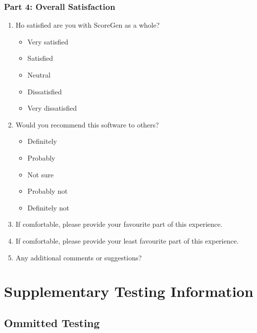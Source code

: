 \documentclass[12pt, titlepage]{article}
\begin{document}
\subsubsection*{Part 4: Overall Satisfaction}
\begin{enumerate}[resume, leftmargin=*]
  \item Ho satisfied are you with ScoreGen as a whole?
  \begin{itemize}
    \item Very satisfied
    \item Satisfied
    \item Neutral
    \item Dissatisfied
    \item Very dissatisfied
  \end{itemize}
  \item Would you recommend this software to others?
  \begin{itemize}
    \item Definitely
    \item Probably
    \item Not sure
    \item Probably not
    \item Definitely not
  \end{itemize}
  \item If comfortable, please provide your favourite part of this experience.
  
  \vspace{5pt}
  \hrulefill
  \item If comfortable, please provide your least favourite part of this experience.
  
  \vspace{5pt}
  \hrulefill
  \item Any additional comments or suggestions?
  
  \vspace{5pt}
  \hrulefill
\end{enumerate}


\section{Supplementary Testing Information}
\subsection{Ommitted Testing}
\end{document}
